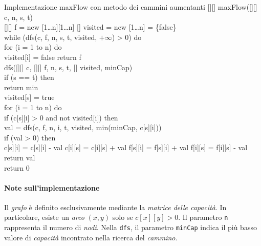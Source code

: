 \begin{minicode}{Implementazione maxFlow con metodo dei cammini aumentanti}
\ind{}[][] maxFlow([][] c,  n,  s,  t)\\
    [][] f = new [1\dots n][1\dots n]\hfill{}
    [] visited = new [1\dots n] = \{false\}\\
    \indf while (dfs(c, f, n, s, t, visited, $+\infty$) > 0) do\\
        \indff for (i = 1 to n) do\\
            visited[i] = false\hfill{}
    \indf return f\\

\nl{}
\rmindent\ind{} dfs([][] c, [][] f,   n,  s,
     t, [] visited, \:minCap)\\
    \indf if (s == t) then\\
        return min\\
    \indf visited[s] = true\\
    \indf for (i = 1 to n) do\\
        \indff if (c[s][i] > 0 and not visited[i]) then\\
             val = dfs(c, f, n, i, t, visited, min(minCap, c[s][i]))\\
            \indfff if (val > 0) then\\
                c[s][i] = c[s][i] - val\hfill{}
                c[i][s] = c[i][s] + val\hfill{}
                f[s][i] = f[s][i] + val\hfill{}
                f[i][s] = f[i][s] - val\hfill{}
                return val\\
    \indf return 0\hfill{}
\end{minicode}

\paragraph{Note sull'implementazione}
Il \emph{grafo} è definito esclusivamente mediante la \emph{matrice delle
capacità}. In particolare, esiste un \emph{arco} $(x,y)$ solo se $c[x][y]>0$.
Il parametro \texttt{n} rappresenta il numero di \emph{nodi}. Nella
\texttt{dfs}, il parametro \texttt{minCap} indica il più basso valore di
\emph{capacità} incontrato nella ricerca del \emph{cammino}.

